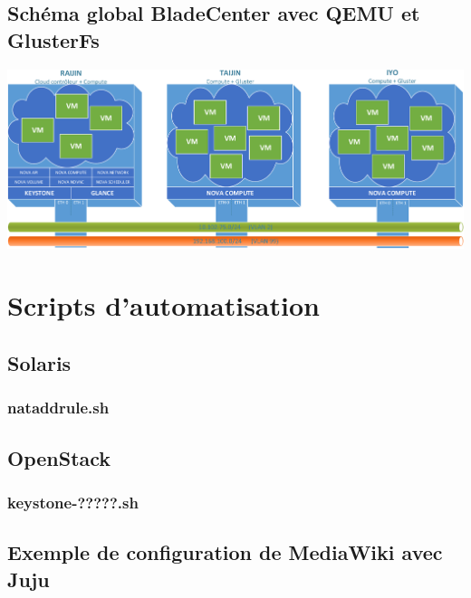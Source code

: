 \documentclass[a4paper,oneside]{report}
\begin{document}
\section{Schéma global BladeCenter avec QEMU et GlusterFs}

\begin{center}
\includegraphics[scale=0.8,angle=90]{images/SchemaBladeQemuGlut-crop.pdf}
\end{center}

\chapter{Scripts d'automatisation}
\section{Solaris}
\subsection{nataddrule.sh}

\section{OpenStack}
\subsection{keystone-?????.sh} \label{script:keystoneData}

\section{Exemple de configuration de MediaWiki avec Juju} \label{auto:juju}
\end{document}
